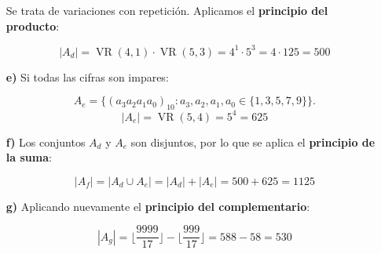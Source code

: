 \documentclass[a4paper,12pt]{article}
\begin{document}
\begin{ejercicio}[title=Ejercicio 2]
\begin{itemize}

Se trata de variaciones con repetición.  
Aplicamos el \textbf{principio del producto}:

\[
|A_d| = \operatorname{VR}(4,1) \cdot \operatorname{VR}(5,3) = 4^1 \cdot 5^3 = 4 \cdot 125 = \boxed{500}
\]

\item[\textbf{e)}]
Si todas las cifras son impares:

\[
A_e = \{ (a_3a_2a_1a_0)_{10} : a_3,a_2,a_1,a_0 \in \{1,3,5,7,9\} \}.
\]
\[
|A_e| = \operatorname{VR}(5,4) = 5^4 = \boxed{625}
\]

\item[\textbf{f)}]
Los conjuntos \( A_d \) y \( A_e \) son disjuntos, por lo que se aplica el \textbf{principio de la suma}:

\[
|A_f| = |A_d \cup A_e| = |A_d| + |A_e| = 500 + 625 = \boxed{1125}
\]

\item[\textbf{g)}]
Aplicando nuevamente el \textbf{principio del complementario}:

\[
|A_g| = \bigg\lfloor \frac{9999}{17} \bigg\rfloor - \bigg\lfloor \frac{999}{17} \bigg\rfloor = 588 - 58 = \boxed{530}
\]
\end{itemize}

\end{ejercicio}
\end{document}
